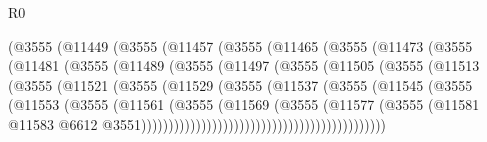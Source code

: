 \begin{lexlean}{R0}
\begin{coremodule}
                      (@3555
                        (@11449
                          (@3555
                            (@11457
                              (@3555
                                (@11465
                                  (@3555
                                    (@11473
                                      (@3555
                                        (@11481
                                          (@3555
                                            (@11489
                                              (@3555
                                                (@11497
                                                  (@3555
                                                    (@11505
                                                      (@3555
                                                        (@11513
                                                          (@3555
                                                            (@11521
                                                              (@3555
                                                                (@11529
                                                                  (@3555
                                                                    (@11537
                                                                      (@3555
                                                                        (@11545
                                                                          (@3555
                                                                            (@11553
                                                                              (@3555
                                                                                (@11561
                                                                                  (@3555
                                                                                    (@11569
                                                                                      (@3555
                                                                                        (@11577
                                                                                          (@3555
                                                                                            (@11581
                                                                                              @11583
                                                                                              @6612
                                                                                              @3551)))))))))))))))))))))))))))))))))))))))))))))

\end{coremodule}
\end{lexlean}
